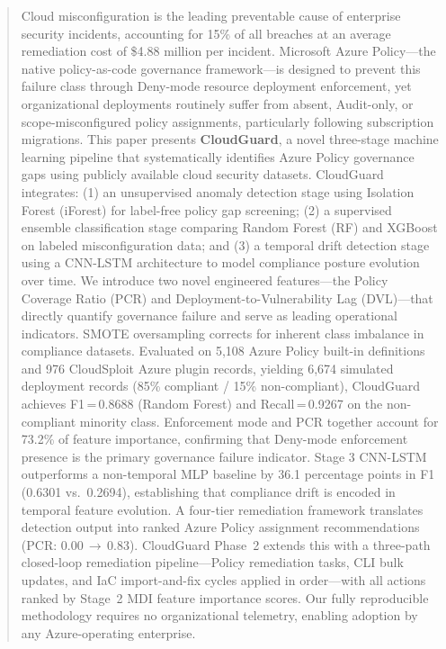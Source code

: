 \documentclass[conference]{IEEEtran}
\begin{document}
\begin{abstract}
Cloud misconfiguration is the leading preventable cause of enterprise 
security incidents, accounting for 15\% of all breaches at an average 
remediation cost of \$4.88 million per incident. Microsoft Azure 
Policy---the native policy-as-code governance framework---is designed 
to prevent this failure class through Deny-mode resource deployment 
enforcement, yet organizational deployments routinely suffer from 
absent, Audit-only, or scope-misconfigured policy assignments, 
particularly following subscription migrations. This paper presents 
\textbf{CloudGuard}, a novel three-stage machine learning pipeline that 
systematically identifies Azure Policy governance gaps using publicly 
available cloud security datasets. CloudGuard integrates: (1) an 
unsupervised anomaly detection stage using Isolation Forest (iForest) 
for label-free policy gap screening; (2) a supervised ensemble 
classification stage comparing Random Forest (RF) and XGBoost on 
labeled misconfiguration data; and (3) a temporal drift detection stage 
using a CNN-LSTM architecture to model compliance posture evolution 
over time. We introduce two novel engineered features---the Policy 
Coverage Ratio (PCR) and Deployment-to-Vulnerability Lag (DVL)---that 
directly quantify governance failure and serve as leading operational 
indicators. SMOTE oversampling corrects for inherent class imbalance in 
compliance datasets. Evaluated on 5,108 Azure Policy built-in 
definitions and 976 CloudSploit Azure plugin records, yielding 6,674 
simulated deployment records (85\% compliant / 15\% non-compliant), 
CloudGuard achieves F1\,=\,0.8688 (Random Forest) and Recall\,=\,0.9267 
on the non-compliant minority class. Enforcement mode and PCR together 
account for 73.2\% of feature importance, confirming that Deny-mode 
enforcement presence is the primary governance failure indicator. 
Stage 3 CNN-LSTM outperforms a non-temporal MLP baseline by 36.1 
percentage points in F1 (0.6301 vs.\ 0.2694), establishing that 
compliance drift is encoded in temporal feature evolution. A four-tier 
remediation framework translates detection output into ranked Azure 
Policy assignment recommendations (PCR: 0.00\,$\to$\,0.83). 
CloudGuard Phase~2 extends this with a three-path closed-loop 
remediation pipeline---Policy remediation tasks, CLI bulk updates, and 
IaC import-and-fix cycles applied in order---with all actions ranked by 
Stage~2 MDI feature importance scores. Our fully reproducible 
methodology requires no organizational telemetry, enabling adoption by 
any Azure-operating enterprise.
\end{abstract}
\end{document}
